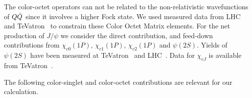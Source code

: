 \documentclass[aps,prc,preprint,superscriptaddress,showpacs,showkeys,amsmath]{revtex4-1}
\begin{document}
The color-octet operators can not be related to the non-relativistic
wavefunctions of $Q{\bar{Q}}$ since it involves a higher Fock state.
We used measured data from LHC~\cite{Chatrchyan:2011kc,Khachatryan:2015rra,Aad:2015duc} 
and TeVatron~\cite{Acosta:2004yw} to constrain these  Color Octet Matrix elements.
For the net production of $J/\psi$ we consider the direct contribution, and
feed-down contributions from $\chi_{c0}(1P)$, $\chi_{c1}(1P)$,
$\chi_{c2}(1P)$ and $\psi(2S)$. 
Yields of $\psi(2S)$ have been measured at TeVatron~\cite{Abe:1997yz} and LHC~\cite{Chatrchyan:2011kc}. 
Data for $\chi_{cJ}$ is available from TeVatron~\cite{Abe:1997yz}.  

 The following color-singlet and color-octet contributions are relevant for our
calculation.
\end{document}
